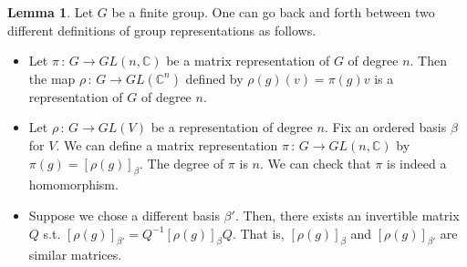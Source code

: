 \documentclass{book}
\newcommand{\C}{\mathbb{C}}
\theoremstyle{definition}
\newtheorem{lemma}{Lemma}[chapter]
\theoremstyle{remarkstyle}
\begin{document}
\begin{lemma}
    Let $G$ be a finite group. One can go back and forth between two different definitions of group representations as follows. 
    \begin{itemize}
        \item Let $\pi\,:\, G\rightarrow GL(n,\C)$ be a matrix representation of $G$ of degree $n$. Then the map $\rho\,:\, G\rightarrow GL(\C^n)$ defined by $\rho(g)(v)=\pi(g)v$ is a representation of $G$ of degree $n$.
        \item Let $\rho\,:\, G\rightarrow GL(V)$ be a representation of degree $n$. Fix an ordered basis $\beta$ for $V$. We can define a matrix representation $\pi\,:\, G\rightarrow GL(n, \C)$ by $\pi(g) = [\rho(g)]_\beta $. The degree of $\pi$ is $n$. We can check that $\pi$ is indeed a homomorphism.
        \item Suppose we chose a different basis $\beta'$. Then, there exists an invertible matrix $Q$ s.t. $[\rho(g)]_{\beta'} = Q^{-1}[\rho(g)]_\beta Q $. That is, $[\rho(g)]_\beta$ and $[\rho(g)]_{\beta'} $ are similar matrices.
    \end{itemize}
\end{lemma}
\end{document}
